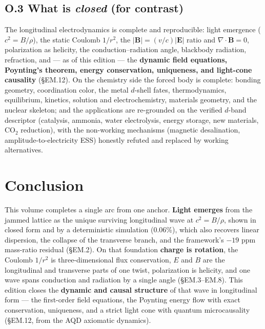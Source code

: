 \documentclass[
  10pt,
]{article}
\begin{document}
\hypertarget{o.3-what-is-closed-for-contrast}{%
\subsection{\texorpdfstring{O.3 What is \emph{closed} (for
contrast)}{O.3 What is closed (for contrast)}}\label{o.3-what-is-closed-for-contrast}}

The longitudinal electrodynamics is complete and reproducible: light
emergence (\(c^2=B/\rho\)), the static Coulomb \(1/r^2\), the
\(|\mathbf B|=(v/c)|\mathbf E|\) ratio and \(\nabla\!\cdot\mathbf B=0\),
polarization as helicity, the conduction--radiation angle, blackbody
radiation, refraction, and --- as of this edition --- the
\textbf{dynamic field equations, Poynting's theorem, energy
conservation, uniqueness, and light-cone causality} (§EM.12). On the
chemistry side the forced body is complete: bonding geometry,
coordination color, the metal \(d\)-shell fates, thermodynamics,
equilibrium, kinetics, solution and electrochemistry, materials
geometry, and the nuclear skeleton; and the applications are re-grounded
on the verified \(d\)-band descriptor (catalysis, ammonia, water
electrolysis, energy storage, new materials, CO\(_2\) reduction), with
the non-working mechanisms (magnetic desalination,
amplitude-to-electricity ESS) honestly refuted and replaced by working
alternatives.

\newpage

\hypertarget{conclusion}{%
\section{Conclusion}\label{conclusion}}

This volume completes a single arc from one anchor. \textbf{Light
emerges} from the jammed lattice as the unique surviving longitudinal
wave at \(c^2 = B/\rho\), shown in closed form and by a deterministic
simulation (0.06\%), which also recovers linear dispersion, the collapse
of the transverse branch, and the framework's \(-19\) ppm mass-ratio
residual (§EM.2). On that foundation \textbf{charge is rotation}, the
Coulomb \(1/r^2\) is three-dimensional flux conservation, \(E\) and
\(B\) are the longitudinal and transverse parts of one twist,
polarization is helicity, and one wave spans conduction and radiation by
a single angle (§EM.3--EM.8). This edition closes the \textbf{dynamic
and causal structure} of that wave in longitudinal form --- the
first-order field equations, the Poynting energy flow with exact
conservation, uniqueness, and a strict light cone with quantum
microcausality (§EM.12, from the AQD axiomatic dynamics).
\end{document}
